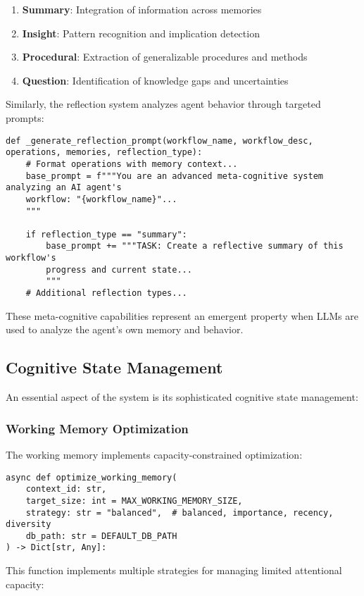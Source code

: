 \documentclass[12pt,a4paper]{article}
\begin{document}
\begin{enumerate}[label=\arabic*.]
    \item \textbf{Summary}: Integration of information across memories
    \item \textbf{Insight}: Pattern recognition and implication detection
    \item \textbf{Procedural}: Extraction of generalizable procedures and methods
    \item \textbf{Question}: Identification of knowledge gaps and uncertainties
\end{enumerate}

Similarly, the reflection system analyzes agent behavior through targeted prompts:
\begin{pageablecode}
\begin{verbatim}
def _generate_reflection_prompt(workflow_name, workflow_desc, operations, memories, reflection_type):
    # Format operations with memory context...
    base_prompt = f"""You are an advanced meta-cognitive system analyzing an AI agent's
    workflow: "{workflow_name}"...
    """

    if reflection_type == "summary":
        base_prompt += """TASK: Create a reflective summary of this workflow's
        progress and current state...
        """
    # Additional reflection types...
\end{verbatim}
\end{pageablecode}
These meta-cognitive capabilities represent an emergent property when LLMs are used to analyze the agent's own memory and behavior.

\subsection*{Cognitive State Management}

An essential aspect of the system is its sophisticated cognitive state management:

\subsubsection*{Working Memory Optimization}

The working memory implements capacity-constrained optimization:
\begin{pageablecode}
\begin{verbatim}
async def optimize_working_memory(
    context_id: str,
    target_size: int = MAX_WORKING_MEMORY_SIZE,
    strategy: str = "balanced",  # balanced, importance, recency, diversity
    db_path: str = DEFAULT_DB_PATH
) -> Dict[str, Any]:
\end{verbatim}
\end{pageablecode}
This function implements multiple strategies for managing limited attentional capacity:
\end{document}
